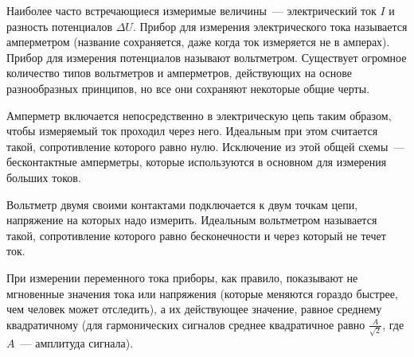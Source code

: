


Наиболее часто встречающиеся измеримые величины~--- электрический ток $I$ и
разность потенциалов $\Delta U$. Прибор для измерения электрического тока
называется амперметром (название сохраняется, даже когда ток измеряется не в
амперах). Прибор для измерения потенциалов называют вольтметром. Существует
огромное количество типов вольтметров и амперметров, действующих на основе
разнообразных принципов, но все они сохраняют некоторые общие черты.

Амперметр включается непосредственно в электрическую цепь таким образом, чтобы
измеряемый ток проходил через него. Идеальным при этом считается такой,
сопротивление которого равно нулю. Исключение из этой общей схемы~---
бесконтактные амперметры, которые используются в основном для измерения больших
токов.

Вольтметр двумя своими контактами подключается к двум точкам цепи, напряжение на
которых надо измерить. Идеальным вольтметром называется такой, сопротивление
которого равно бесконечности и через который не течет ток.

При измерении переменного тока приборы, как правило, показывают не мгновенные
значения тока или напряжения (которые меняются гораздо быстрее, чем человек
может отследить), а их действующее значение, равное среднему квадратичному (для
гармонических сигналов среднее квадратичное равно $\frac{A}{\sqrt{2}}$, где
$A$~--- амплитуда сигнала).

